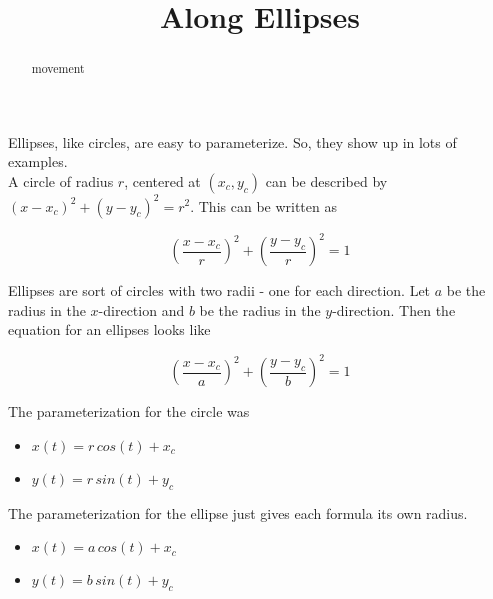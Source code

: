 \documentclass{ximera}
\title{Along Ellipses}
\begin{document}
\begin{abstract}
movement
\end{abstract}
\maketitle



Ellipses, like circles, are easy to parameterize.  So, they show up in lots of examples. \\



A circle of radius $r$, centered at $(x_c, y_c)$ can be described by $(x-x_c)^2+(y-y_c)^2=r^2$.  This can be written as 



\[          \left(\frac{x-x_c}{r}\right)^2+\left(\frac{y-y_c}{r}\right)^2 = 1 \]

Ellipses are sort of circles with two radii - one for each direction. Let $a$ be the radius in the $x$-direction and $b$ be the radius in the $y$-direction.  Then the equation for an ellipses looks like 



\[          \left(\frac{x-x_c}{a}\right)^2+\left(\frac{y-y_c}{b}\right)^2 = 1 \]







The parameterization for the circle was

\begin{itemize}
\item $x(t) = r \, cos(t) + x_c$
\item $y(t) = r \, sin(t) + y_c$
\end{itemize}









The parameterization for the ellipse just gives each formula its own radius.

\begin{itemize}
\item $x(t) = a \, cos(t) + x_c$
\item $y(t) = b \, sin(t) + y_c$
\end{itemize}







\begin{center}
\end{center}
\end{document}
